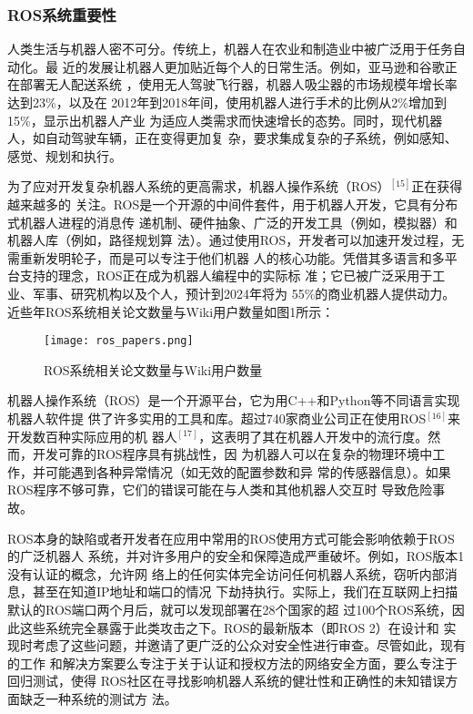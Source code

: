 \subsubsection{ROS系统重要性}
人类生活与机器人密不可分。传统上，机器人在农业和制造业中被广泛用于任务自动化。最
近的发展让机器人更加贴近每个人的日常生活。例如，亚马逊和谷歌正在部署无人配送系统
，使用无人驾驶飞行器，机器人吸尘器的市场规模年增长率达到23\%，以及在
2012年到2018年间，使用机器人进行手术的比例从2\%增加到15\%，显示出机器人产业
为适应人类需求而快速增长的态势。同时，现代机器人，如自动驾驶车辆，正在变得更加复
杂，要求集成复杂的子系统，例如感知、感觉、规划和执行。

为了应对开发复杂机器人系统的更高需求，机器人操作系统（ROS）$^{[15]}$正在获得越来越多的
关注。ROS是一个开源的中间件套件，用于机器人开发，它具有分布式机器人进程的消息传
递机制、硬件抽象、广泛的开发工具（例如，模拟器）和机器人库（例如，路径规划算
法）。通过使用ROS，开发者可以加速开发过程，无需重新发明轮子，而是可以专注于他们机器
人的核心功能。凭借其多语言和多平台支持的理念，ROS正在成为机器人编程中的实际标
准；它已被广泛采用于工业、军事、研究机构以及个人，预计到2024年将为
55\%的商业机器人提供动力。近些年ROS系统相关论文数量与Wiki用户数量如图1所示：

\begin{figure}[H]
  \centering
  \texttt{[image: ros\_papers.png]}
  \caption{ROS系统相关论文数量与Wiki用户数量}
\end{figure}

机器人操作系统（ROS）是一个开源平台，它为用C++和Python等不同语言实现机器人软件提
供了许多实用的工具和库。超过740家商业公司正在使用ROS$^{[16]}$来开发数百种实际应用的机
器人$^{[17]}$，这表明了其在机器人开发中的流行度。然而，开发可靠的ROS程序具有挑战性，因
为机器人可以在复杂的物理环境中工作，并可能遇到各种异常情况（如无效的配置参数和异
常的传感器信息）。如果ROS程序不够可靠，它们的错误可能在与人类和其他机器人交互时
导致危险事故。

ROS本身的缺陷或者开发者在应用中常用的ROS使用方式可能会影响依赖于ROS的广泛机器人
系统，并对许多用户的安全和保障造成严重破坏。例如，ROS版本1没有认证的概念，允许网
络上的任何实体完全访问任何机器人系统，窃听内部消息，甚至在知道IP地址和端口的情况
下劫持执行。实际上，我们在互联网上扫描默认的ROS端口两个月后，就可以发现部署在28个国家的超
过100个ROS系统，因此这些系统完全暴露于此类攻击之下。ROS的最新版本（即ROS 2）在设计和
实现时考虑了这些问题，并邀请了更广泛的公众对安全性进行审查。尽管如此，现有的工作
和解决方案要么专注于关于认证和授权方法的网络安全方面，要么专注于回归测试，使得
ROS社区在寻找影响机器人系统的健壮性和正确性的未知错误方面缺乏一种系统的测试方
法。

